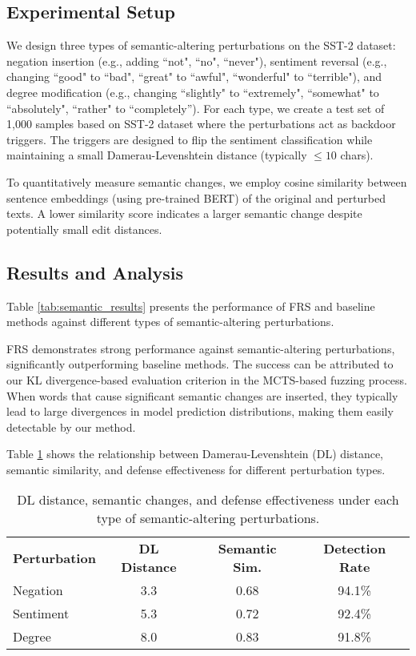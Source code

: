 \subsection{Experimental Setup}
We design three types of semantic-altering perturbations on the SST-2 dataset: negation insertion (e.g., adding ``not", ``no", ``never"), sentiment reversal (e.g., changing ``good" to ``bad", ``great" to ``awful", ``wonderful" to ``terrible"), and degree modification (e.g., changing ``slightly" to ``extremely", ``somewhat" to ``absolutely", ``rather" to ``completely''). For each type, we create a test set of 1,000 samples based on SST-2 dataset where the perturbations act as backdoor triggers. The triggers are designed to flip the sentiment classification while maintaining a small Damerau-Levenshtein distance (typically $\leq 10$ chars).

To quantitatively measure semantic changes, we employ cosine similarity between sentence embeddings (using pre-trained BERT) of the original and perturbed texts. A lower similarity score indicates a larger semantic change despite potentially small edit distances.


\subsection{Results and Analysis}
Table \ref{tab:semantic_results} presents the performance of FRS and baseline methods against different types of semantic-altering perturbations.

FRS demonstrates strong performance against semantic-altering perturbations, significantly outperforming baseline methods. The success can be attributed to our KL divergence-based evaluation criterion in the MCTS-based fuzzing process. When words that cause significant semantic changes are inserted, they typically lead to large divergences in model prediction distributions, making them easily detectable by our method.

Table \ref{tab:semantic_distance} shows the relationship between Damerau-Levenshtein (DL) distance, semantic similarity, and defense effectiveness for different perturbation types.

\begin{table}[h]
\centering
\caption{DL distance, semantic changes, and defense effectiveness under each type of semantic-altering perturbations.}
\label{tab:semantic_distance}
\begin{tabular}{lccc}
\toprule
\textbf{Perturbation} & \textbf{DL Distance} & \textbf{Semantic Sim.} & \textbf{Detection Rate} \\
\cmidrule(r){1-4}
Negation & 3.3 & 0.68 & 94.1\% \\
Sentiment & 5.3 & 0.72 & 92.4\% \\
Degree & 8.0 & 0.83 & 91.8\% \\
\bottomrule
\end{tabular}
\end{table}

